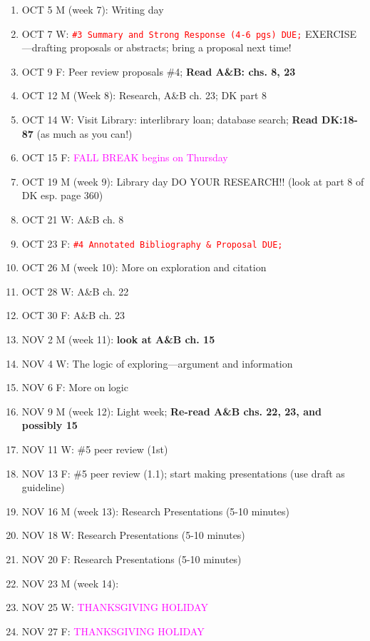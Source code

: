 \documentclass[11pt]{article}
\begin{document}
\begin{enumerate}
\item OCT 5 M (week 7): Writing day 
\item[] OCT 7 W: \textcolor{red}{\texttt{\#3 Summary and Strong Response (4-6 pgs) DUE;}} EXERCISE---drafting proposals or abstracts; bring a proposal next time!
\item[] OCT 9 F: Peer review proposals \#4; {\bf Read A\&B: chs. 8, 23}
 
\item OCT 12 M (Week 8): Research, A\&B ch. 23; DK part 8
\item[] OCT 14 W: Visit Library: interlibrary loan; database search; {\bf Read DK:18-87} (as much as you can!)
\item[]  OCT 15 F: \textcolor{magenta}{FALL BREAK begins on Thursday} 

\item OCT 19 M (week 9): Library day DO YOUR RESEARCH!! (look at part 8 of DK esp. page 360)
\item[] OCT 21 W:  A\&B ch. 8
\item[] OCT 23 F: \textcolor{red}{\texttt{\#4 Annotated Bibliography \& Proposal DUE;}} 

\item OCT 26 M (week 10): More on exploration and citation
\item[] OCT 28 W: A\&B ch. 22
\item[] OCT 30 F: A\&B ch. 23

\item NOV 2 M (week 11): {\bf look at A\&B ch. 15} 
\item[] NOV 4 W: The logic of exploring---argument and information
\item[] NOV 6 F: More on logic

\item NOV 9 M (week 12): Light week; {\bf Re-read A\&B chs. 22, 23, and possibly 15}
\item[] NOV 11 W: \#5 peer review (1st)
\item[] NOV 13 F: \#5 peer review (1.1); start making presentations (use draft as guideline)

\item NOV 16 M (week 13): Research Presentations (5-10 minutes)
\item[] NOV 18 W: Research Presentations (5-10 minutes)
\item[] NOV 20 F: Research Presentations (5-10 minutes)

\item NOV 23 M (week 14):  
\item[] NOV 25 W: \textcolor{magenta}{THANKSGIVING HOLIDAY}
\item[] NOV 27 F: \textcolor{magenta}{THANKSGIVING HOLIDAY}


\end{enumerate}
\end{document}
